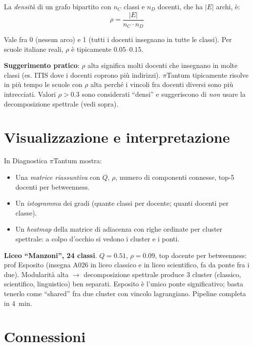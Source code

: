 \begin{defbox}
La \emph{densit\`a} di un grafo bipartito con $n_C$ classi e
$n_D$ docenti, che ha $|E|$ archi, \`e:
\[
  \rho = \frac{|E|}{n_C \cdot n_D}
\]
\end{defbox}

Vale fra 0 (nessun arco) e 1 (tutti i docenti insegnano in
tutte le classi). Per scuole italiane reali, $\rho$ \`e
tipicamente $0.05$--$0.15$.

\textbf{Suggerimento pratico}: $\rho$ alta significa molti
docenti che insegnano in molte classi (es. ITIS dove i
docenti coprono pi\`u indirizzi). $\pi$Tantum tipicamente
risolve in pi\`u tempo le scuole con $\rho$ alta perch\'e i
vincoli fra docenti diversi sono pi\`u intrecciati. Valori
$\rho > 0.3$ sono considerati ``densi'' e suggeriscono di
\emph{non} usare la decomposizione spettrale (vedi sopra).

\section{Visualizzazione e interpretazione}

In Diagnostica $\pi$Tantum mostra:
\begin{itemize}
\item Una \emph{matrice riassuntiva} con $Q$, $\rho$,
  numero di componenti connesse, top-5 docenti per
  betweenness.
\item Un \emph{istogramma} dei gradi (quante classi per
  docente; quanti docenti per classe).
\item Un \emph{heatmap} della matrice di adiacenza con
  righe ordinate per cluster spettrale: a colpo d'occhio
  si vedono i cluster e i ponti.
\end{itemize}

\begin{casostudiobox}
\textbf{Liceo ``Manzoni'', 24 classi}.
$Q = 0.51$, $\rho = 0.09$, top docente per betweenness:
prof Esposito (insegna A026 in liceo classico e in liceo
scientifico, fa da ponte fra i due). Modularit\`a alta
$\to$ decomposizione spettrale produce 3 cluster (classico,
scientifico, linguistico) ben separati. Esposito \`e l'unico
ponte significativo; basta tenerlo come ``shared'' fra due
cluster con vincolo lagrangiano. Pipeline completa in
4~min.
\end{casostudiobox}

\section{Connessioni}

